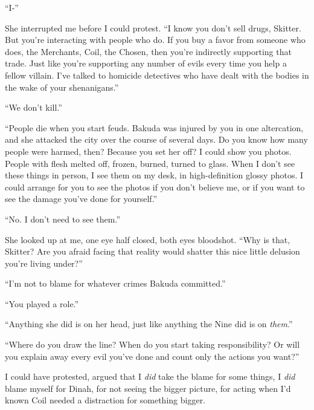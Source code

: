 ``I-''



She interrupted me before I could protest.  ``I know you don't sell drugs, Skitter.  But you're interacting with people who do.  If you buy a favor from someone who does, the Merchants, Coil, the Chosen, then you're indirectly supporting that trade.  Just like you're supporting any number of evils every time you help a fellow villain.  I've talked to homicide detectives who have dealt with the bodies in the wake of your shenanigans.''



``We don't kill.''



``People die when you start feuds.  Bakuda was injured by you in one altercation, and she attacked the city over the course of several days.  Do you know how many people were harmed, then?  Because you set her off?  I could show you photos.  People with flesh melted off, frozen, burned, turned to glass.  When I don't see these things in person, I see them on my desk, in high-definition glossy photos.  I could arrange for you to see the photos if you don't believe me, or if you want to see the damage you've done for yourself.''



``No.  I don't need to see them.''



She looked up at me, one eye half closed, both eyes bloodshot.  ``Why is that, Skitter?  Are you afraid facing that reality would shatter this nice little delusion you're living under?''



``I'm not to blame for whatever crimes Bakuda committed.''



``You played a role.''



``Anything she did is on her head, just like anything the Nine did is on \emph{them}.''



``Where do you draw the line?  When do you start taking responsibility?  Or will you explain away every evil you've done and count only the actions you want?''



I could have protested, argued that I \emph{did} take the blame for some things, I \emph{did} blame myself for Dinah, for not seeing the bigger picture, for acting when I'd known Coil needed a distraction for something bigger.



